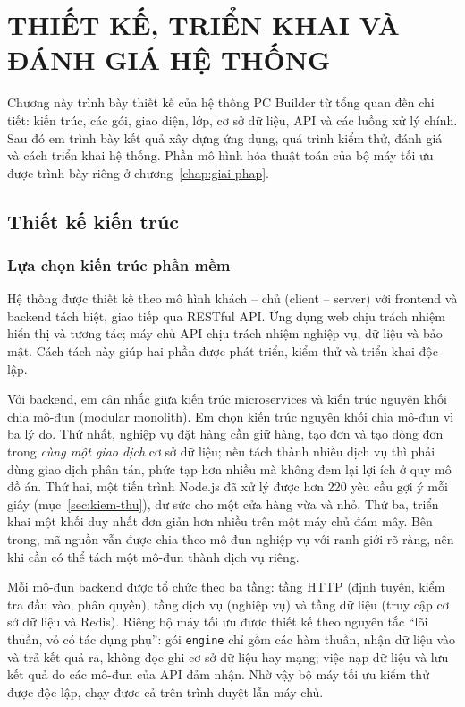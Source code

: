 \chapter{THIẾT KẾ, TRIỂN KHAI VÀ ĐÁNH GIÁ HỆ THỐNG}
\label{chap:thiet-ke}

Chương này trình bày thiết kế của hệ thống PC Builder từ tổng quan đến chi tiết: kiến trúc, các gói, giao diện, lớp, cơ sở dữ liệu, API và các luồng xử lý chính. Sau đó em trình bày kết quả xây dựng ứng dụng, quá trình kiểm thử, đánh giá và cách triển khai hệ thống. Phần mô hình hóa thuật toán của bộ máy tối ưu được trình bày riêng ở chương~\ref{chap:giai-phap}.

\section{Thiết kế kiến trúc}

\subsection{Lựa chọn kiến trúc phần mềm}

Hệ thống được thiết kế theo mô hình khách -- chủ (client -- server) với frontend và backend tách biệt, giao tiếp qua RESTful API. Ứng dụng web chịu trách nhiệm hiển thị và tương tác; máy chủ API chịu trách nhiệm nghiệp vụ, dữ liệu và bảo mật. Cách tách này giúp hai phần được phát triển, kiểm thử và triển khai độc lập.

Với backend, em cân nhắc giữa kiến trúc microservices và kiến trúc nguyên khối chia mô-đun (modular monolith). Em chọn kiến trúc nguyên khối chia mô-đun vì ba lý do. Thứ nhất, nghiệp vụ đặt hàng cần giữ hàng, tạo đơn và tạo dòng đơn trong \emph{cùng một giao dịch} cơ sở dữ liệu; nếu tách thành nhiều dịch vụ thì phải dùng giao dịch phân tán, phức tạp hơn nhiều mà không đem lại lợi ích ở quy mô đồ án. Thứ hai, một tiến trình Node.js đã xử lý được hơn 220 yêu cầu gợi ý mỗi giây (mục~\ref{sec:kiem-thu}), dư sức cho một cửa hàng vừa và nhỏ. Thứ ba, triển khai một khối duy nhất đơn giản hơn nhiều trên một máy chủ đám mây. Bên trong, mã nguồn vẫn được chia theo mô-đun nghiệp vụ với ranh giới rõ ràng, nên khi cần có thể tách một mô-đun thành dịch vụ riêng.

Mỗi mô-đun backend được tổ chức theo ba tầng: tầng HTTP (định tuyến, kiểm tra đầu vào, phân quyền), tầng dịch vụ (nghiệp vụ) và tầng dữ liệu (truy cập cơ sở dữ liệu và Redis). Riêng bộ máy tối ưu được thiết kế theo nguyên tắc ``lõi thuần, vỏ có tác dụng phụ'': gói \texttt{engine} chỉ gồm các hàm thuần, nhận dữ liệu vào và trả kết quả ra, không đọc ghi cơ sở dữ liệu hay mạng; việc nạp dữ liệu và lưu kết quả do các mô-đun của API đảm nhận. Nhờ vậy bộ máy tối ưu kiểm thử được độc lập, chạy được cả trên trình duyệt lẫn máy chủ.

